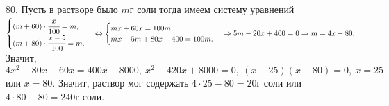 80. Пусть в растворе было $m$г соли тогда имеем систему уравнений $\begin{cases} (m+60)\cdot\cfrac{x}{100}=m,\\ (m+80)\cdot\cfrac{x-5}{100}=m.\end{cases}\Leftrightarrow \begin{cases} mx+60x=100m,\\ mx-5m+80x-400=100m.\end{cases}\Rightarrow
5m-20x+400=0\Rightarrow m=4x-80.$ Значит, $4x^2-80x+60x=400x-8000,\ x^2-420x+8000=0,\ (x-25)(x-80)=0,\ x=25$ или $x=80.$ Значит, раствор мог содержать $4\cdot25-80=20$г соли или $4\cdot80-80=240$г соли.\\
